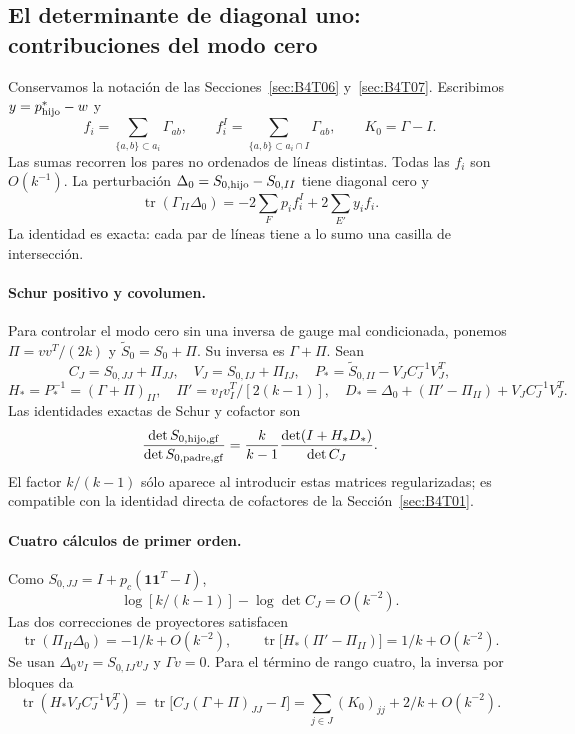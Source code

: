 \subsection{El determinante de diagonal uno: contribuciones del modo cero}\label{sec:B4T08}
Conservamos la notación de las Secciones~\ref{sec:B4T06} y~\ref{sec:B4T07}. Escribimos
$y=p^*_{\rm hijo}-w$ y
\[
 f_i=\sum_{\{a,b\}\subset a_i}\Gamma_{ab},\qquad
 f_i^I=\sum_{\{a,b\}\subset a_i\cap I}\Gamma_{ab},
 \qquad K_0=\Gamma-I.
\]
Las sumas recorren los pares no ordenados de líneas distintas.
Todas las $f_i$ son $O(k^{-1})$.
La perturbación $\Delta_0=S_{0,\rm hijo}-S_{0,II}$ tiene diagonal cero y
\[
 \operatorname{tr}(\Gamma_{II}\Delta_0)
 =-2\sum_Fp_i f_i^I+2\sum_{E'}y_i f_i.
\]
La identidad es exacta: cada par de líneas tiene a lo sumo una casilla de intersección.

\paragraph{Schur positivo y covolumen.}
Para controlar el modo cero sin una inversa de gauge mal condicionada,
ponemos $\Pi=vv^T/(2k)$ y $\widetilde S_0=S_0+\Pi$.
Su inversa es $\Gamma+\Pi$. Sean
\[
 C_J=S_{0,JJ}+\Pi_{JJ},\quad V_J=S_{0,IJ}+\Pi_{IJ},\quad
 P_*=\widetilde S_{0,II}-V_J C_J^{-1}V_J^T,
\]
\[
 H_*=P_*^{-1}=(\Gamma+\Pi)_{II},\quad
 \Pi'=v_Iv_I^T/[2(k-1)],\quad
 D_*=\Delta_0+(\Pi'-\Pi_{II})+V_JC_J^{-1}V_J^T.
\]
Las identidades exactas de Schur y cofactor son
\[
 \frac{\det S_{0,\rm hijo,gf}}{\det S_{0,\rm padre,gf}}
 =\frac{k}{k-1}\frac{\det(I+H_*D_*)}{\det C_J}.
\]
El factor $k/(k-1)$ sólo aparece al introducir estas matrices regularizadas;
es compatible con la identidad directa de cofactores de la Sección~\ref{sec:B4T01}.

\paragraph{Cuatro cálculos de primer orden.}
Como $S_{0,JJ}=I+p_c(\mathbf1\mathbf1^T-I)$,
\[
 \log[k/(k-1)]-\log\det C_J=O(k^{-2}).
\]
Las dos correcciones de proyectores satisfacen
\[
 \operatorname{tr}(\Pi_{II}\Delta_0)=-1/k+O(k^{-2}),\qquad
 \operatorname{tr}\big[H_*(\Pi'-\Pi_{II})\big]=1/k+O(k^{-2}).
\]
Se usan $\Delta_0v_I=S_{0,IJ}v_J$ y $\Gamma v=0$.
Para el término de rango cuatro, la inversa por bloques da
\[
 \operatorname{tr}(H_*V_JC_J^{-1}V_J^T)
 =\operatorname{tr}\big[C_J(\Gamma+\Pi)_{JJ}-I\big]
 =\sum_{j\in J}(K_0)_{jj}+2/k+O(k^{-2}).
\]

